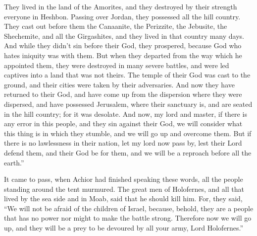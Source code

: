 {They lived in the land of the Amorites, and they destroyed by their strength everyone in Heshbon. Passing over Jordan, they possessed all the hill country.
They cast out before them the Canaanite, the Perizzite, the Jebusite, the Shechemite, and all the Girgashites, and they lived in that country many days.
And while they didn’t sin before their God, they prospered, because God who hates iniquity was with them.
But when they departed from the way which he appointed them, they were destroyed in many severe battles, and were led captives into a land that was not theirs. The temple of their God was cast to the ground, and their cities were taken by their adversaries.
And now they have returned to their God, and have come up from the dispersion where they were dispersed, and have possessed Jerusalem, where their sanctuary is, and are seated in the hill country; for it was desolate.
And now, my lord and master, if there is any error in this people, and they sin against their God, we will consider what this thing is in which they stumble, and we will go up and overcome them.
But if there is no lawlessness in their nation, let my lord now pass by, lest their Lord defend them, and their God be for them, and we will be a reproach before all the earth.”
\par }{\PP {}It came to pass, when Achior had finished speaking these words, all the people standing around the tent murmured. The great men of Holofernes, and all that lived by the sea side and in Moab, said that he should kill him.
For, they said, “We will not be afraid of the children of Israel, because, behold, they are a people that has no power nor might to make the battle strong.
Therefore now we will go up, and they will be a prey to be devoured by all your army, Lord Holofernes.”

}

